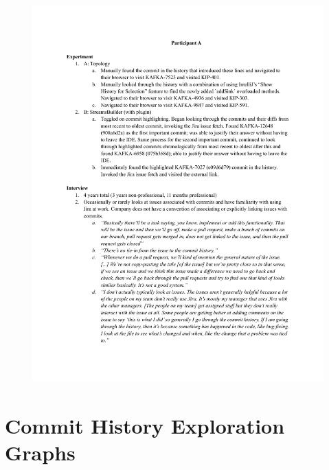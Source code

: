 \begin{figure}[H]
    \includegraphics[page=20,width=\textwidth]{./files/session-summaries.pdf}
\end{figure}


\pagebreak

\section{Commit History Exploration Graphs}
\label{sec:All-Exploration-Graphs}


\endinput